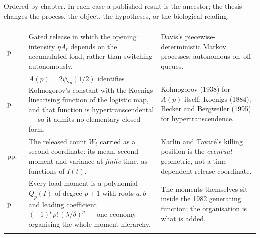 \clearpage
{}

{\noindent
Ordered by chapter. In each case a published result is the ancestor; the thesis changes
the process, the object, the hypotheses, or the biological reading.\par}

\vspace{0.35\baselineskip}
{\small
\begin{xltabular}{\linewidth}{@{}>{\raggedright\arraybackslash}p{20mm}O>{\raggedright\arraybackslash}p{40mm}@{}}
\toprule
{} &  &  \\
\midrule
\endfirsthead
\toprule
{} &  &  \\
\midrule
\endhead
\bottomrule
\endlastfoot

\newline p.\,\pageref{m:sec:gated} &
Gated release in which the opening intensity $\eta A_t$ depends on the accumulated load,
rather than switching autonomously. &
Davis's piecewise-deterministic Markov processes; autonomous on--off queues. \\
\addlinespace[5pt]

\newline p.\,\pageref{gw:thm:main} &
$A(p)=2\psi_{2p}(1/2)$ identifies Kolmogorov's constant with the Koenigs linearising
function of the logistic map, and that function is hypertranscendental --- so it admits no
elementary closed form. &
Kolmogorov (1938) for $A(p)$ itself; Koenigs (1884); Becker and Bergweiler (1995) for
hypertranscendence. \\
\addlinespace[5pt]

\newline pp.\,\pageref{bdc:thm:V}--\pageref{bdc:thm:Wsq} &
The released count $W_t$ carried as a second coordinate: its mean, second moment and
variance at \emph{finite} time, as functions of $I(t)$. &
Karlin and Tavar\'e's killing position is the \emph{eventual} geometric, not a
time-dependent release coordinate. \\
\addlinespace[5pt]

\newline p.\,\pageref{bdc:prop:polynomial} &
Every load moment is a polynomial $Q_p(I)$ of degree $p+1$ with roots $a,b$ and leading
coefficient $(-1)^p p!\,(\lambda/\delta)^p$ --- one economy organising the whole moment
hierarchy. &
The moments themselves sit inside the 1982 generating function; the organisation is what
is added. \\
\addlinespace[5pt]


\end{xltabular}}
